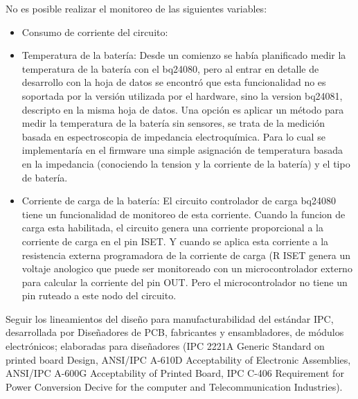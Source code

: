 \noindent No es posible realizar el monitoreo de las siguientes variables:
\begin{itemize}
\item Consumo de corriente del circuito:

\item Temperatura de la batería: Desde un comienzo se había planificado medir la temperatura de la batería con el bq24080, pero al entrar en detalle de desarrollo con la hoja de datos se encontró que esta funcionalidad no es soportada por la versión utilizada por el hardware, sino la version bq24081, descripto en la misma hoja de datos. Una opción es aplicar un método para medir la temperatura de la batería sin sensores, se trata de la medición basada en espectroscopia de impedancia electroquímica\citep{metodo}. Para lo cual se implementaría en el firmware una simple asignación de temperatura basada en la impedancia (conociendo la tension y la corriente de la batería) y el tipo de batería.

\item Corriente de carga de la batería: El circuito controlador de carga bq24080 tiene un funcionalidad de monitoreo de esta corriente. Cuando la funcion de carga esta habilitada, el circuito genera una corriente proporcional a la corriente de carga en el pin ISET.  Y cuando se aplica esta corriente a la resistencia externa programadora de la corriente de carga (R ISET genera un voltaje anologico que puede ser monitoreado con un microcontrolador externo para calcular la corriente del pin OUT. Pero el microcontrolador no tiene un pin ruteado a este nodo del circuito.

\end{itemize}

Seguir los lineamientos del diseño para manufacturabilidad del estándar IPC, desarrollada por Diseñadores de PCB, fabricantes y ensambladores, de módulos electrónicos; elaboradas para diseñadores (IPC 2221A Generic Standard on printed board Design, ANSI/IPC A-610D Acceptability of Electronic Assemblies, ANSI/IPC A-600G Acceptability of Printed Board, IPC C-406 Requirement for Power Conversion Decive for the computer and Telecommunication Industries).










